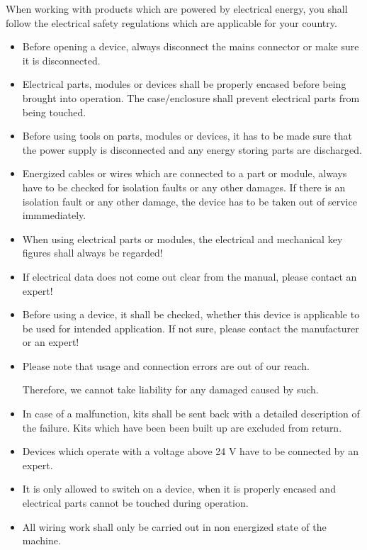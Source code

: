 \documentclass[fleqn,10pt]{SelfArx} %
\begin{document}
When working with products which are powered by electrical energy, you shall follow the electrical safety regulations which are  applicable for your country.
\begin{itemize}[noitemsep] %
\item Before opening a device, always disconnect the mains connector or make sure it is disconnected.
\item Electrical parts, modules or devices shall be properly encased before being brought into operation. The case/enclosure shall prevent electrical parts from being touched.
\item Before using tools on parts, modules or devices, it has to be made sure that the power supply is disconnected and any energy storing parts are discharged.
\item Energized cables or wires which are connected to a part or module, always have to be checked for isolation faults or any other damages. If there is an isolation fault or any other damage, the device has to be taken out of service immmediately.
\item When using electrical parts or modules, the electrical and mechanical key figures shall always be regarded!
\item If electrical data does not come out clear from the manual, please contact an expert!
\item Before using a device, it shall be checked, whether this device is applicable to be used for intended application. If not sure, please contact the manufacturer or an expert!
\item Please note that usage and connection errors are out of our reach. \par Therefore, we cannot take liability for any damaged caused by such.
\item In case of a malfunction, kits shall be sent back with a detailed description of the failure. Kits which have been been built up are excluded from return.
\item Devices which operate with a voltage above 24 V have to be connected by an expert.
\item It is only allowed to switch on a device, when it is properly encased and electrical parts cannot be touched during operation.
\item All wiring work shall only be carried out in non energized state of the machine.

\end{itemize}
\end{document}
